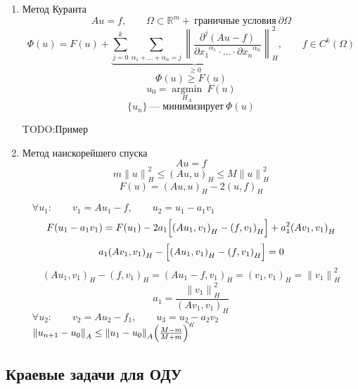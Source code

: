 \documentclass[12pt, a4paper]{article}
\newcommand{\Sum}{\sum\limits}
\begin{document}
\begin{enumerate}
	\item Метод Куранта
	\[ Au = f, \qquad \Omega \subset \mathbb{R}^m + \ \text{граничные условия} \ \partial \Omega  \]
	\[ \Phi (u) = F(u) + \underbrace{\Sum_{j=0}^k \Sum_{\alpha_1 + ... + \alpha_n = j} {\left\lVert \frac{\partial^j (Au - f)}{{\partial x_1}^{\alpha_1} \cdot ... \cdot {\partial x_n}^{\alpha_n}} \right\rVert}_H^2}_{\geq 0}, \qquad f \in C^k(\Omega) \]
	\[ \Phi (u) \geq F(u) \]
	\[ u_0 = \underset{H_A}{\operatorname{argmin}} \ F(u) \]
	\[ \{ u_n \} \ \text{--- минимизирует} \ \Phi(u) \]
	
	TODO:Пример
	
	\item Метод наискорейшего спуска
	\[ Au = f \]
	\[ m {\| u \|}^2_H \leq {(Au, u)}_H \leq M {\| u \|}^2_H \]
	\[ F(u) = {(Au, u)}_H - 2{(u,f)}_H \]
	
	\raisebox{.5pt}{\textcircled{\raisebox{-.9pt} {1}}} $ \quad \forall u_1: \qquad v_1 = Au_1 - f, \qquad u_2 = u_1 - a_1 v_1 $
	\[ F(u_1 - a_1v_1) = F(u_1) - 2a_1 \Bigl[ {(Au_1, v_1)}_H - {(f,v_1)}_H \Bigr] + a_1^2 {(Av_1, v_1)}_H \]
	\[ a_1 {(Av_1, v_1)}_H - \Bigl[ {(Au_1, v_1)}_H - {(f,v_1)}_H \Bigr] = 0 \]
	\[ {(Au_1, v_1)}_H - {(f,v_1)}_H = {(Au_1 - f, v_1)}_H = {(v_1, v_1)}_H = {\| v_1 \|}^2_H \]
	\[ a_1 = \frac{{\| v_1 \|}^2_H}{{(Av_1, v_1)}_H} \]
	\raisebox{.5pt}{\textcircled{\raisebox{-.9pt} {2}}} $ \quad \forall u_2: \qquad v_2 = Au_2 - f_1, \qquad u_3 = u_2 - a_2 v_2 $
	\[ ... \]
	\raisebox{.5pt}{\textcircled{\raisebox{-.9pt} {n}}} $ \quad {\| u_{n+1} - u_0 \|}_A \leq {\| u_1 - u_0 \|}_A {\Bigl(\frac{M-m}{M+m}\Bigr)}^n $
	
\end{enumerate}

\subsection{Краевые задачи для ОДУ}
\end{document}
